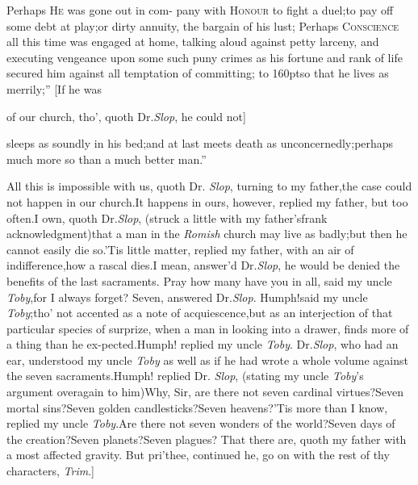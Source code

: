 \documentclass{article}
\begin{document}
\begin{story}{Perhaps \textsc{He} was gone out in com-}
    pany
with \textsc{Honour} to fight a duel;\pb to pay off some debt at
play;\tsh or dirty annuity, the bargain of his lust;
Perhaps \textsc{Conscience} all this time was engaged at
home, talking aloud against petty larceny, and executing vengeance
upon some such puny crimes as his fortune and rank of life secured
him\break
    against all temptation of committing;\break
    \hbox to 160pt{so that he lives as merrily;” [If he was}
\end{story}
\noindent of our church, tho’, quoth Dr.\@ \textit{Slop}, he\break
could not]\tsk 
\begin{story}{sleeps as soundly in his} 
bed;\tsk and at last meets death as
unconcernedly;\tsk perhaps much more so\break
    than a much better man.”
\end{story}
\vspace\parskip
All this is impossible with us, quoth Dr.\@
\textit{Slop}, turning to my father,\tsk the case could
not happen in our church.\tsh It happens in ours,
however, replied my father, but too often.\tsh I own,
quoth Dr.\@ \textit{Slop}, (struck a little with my
father’s\pb frank acknowledgment)\tsk that a man in the
\textit{Romish} church may live as badly;\tsk\break but
then he cannot easily die so.\tsh ’Tis little matter,
replied my father, with an air of indifference,\tsk how
a rascal dies.\tsk\break I mean, answer’d Dr.\@ \textit{Slop},
he would be denied the benefits of the last
sacraments.\break
\tsk Pray how many have you in all, said my uncle
\textit{Toby},\tsk for I always forget?\tsk\break
Seven, answered Dr.\@ \textit{Slop}.\tsk
Humph!\tsk\break said my
uncle \textit{Toby};\tsk tho’ not accented as a note of
acquiescence,\tsk but as an interjection of that
particular species of surprize, when a man in looking
into a drawer, finds more of a thing than he
ex-\break pected.\tsk Humph! replied my uncle \textit{Toby}.
Dr.\@ \textit{Slop}, who had an ear, understood my uncle
\textit{Toby} as well as if he had wrote a whole volume
against the seven sacraments.\tsh Humph! replied Dr.\@
\textit{Slop}, (stating my uncle \textit{Toby}’s
argument over\pb again to him)\tsh Why, Sir, are there not
seven cardinal virtues?\tsh Seven mortal sins?\tsh Seven
golden candlesticks?\tsh Seven heavens?\tsh ’Tis\break
more than I know, replied my uncle\break
\textit{Toby}.\tsh Are
there not seven wonders of the world?\tsh Seven days of
the creation?\tsh Seven planets?\tsh Seven plagues?\tsh
That there are, quoth my father with a most affected
gravity. But pri’thee, continued he, go on with the rest
of thy characters, \textit{Trim}.]
\end{document}
